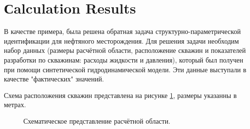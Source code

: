 \documentclass{article}
\begin{document}
\section{Сalculation Results}
В качестве примера, была решена обратная задача структурно-параметрической идентификации для нефтяного месторождения. Для решения задачи необходим набор данных (размеры расчётной области, расположение скважин и показателей разработки по скважинам: расходы жидкости и давления), который был получен при помощи синтетической гидродинамической модели. Эти данные выступали в качестве "фактических" значений. 

Схема расположения скважин представлена на рисунке \ref{fig:map}, размеры указанны в метрах. 
\begin{figure}
    \begin{minipage}[h]{0.69\linewidth}
    \end{minipage} \hfill
    \begin{minipage}[h]{0.29\linewidth}
    \end{minipage} 
    \caption{Схематическое представление расчётной области.}
    \label{fig:map}
\end{figure}
\end{document}
